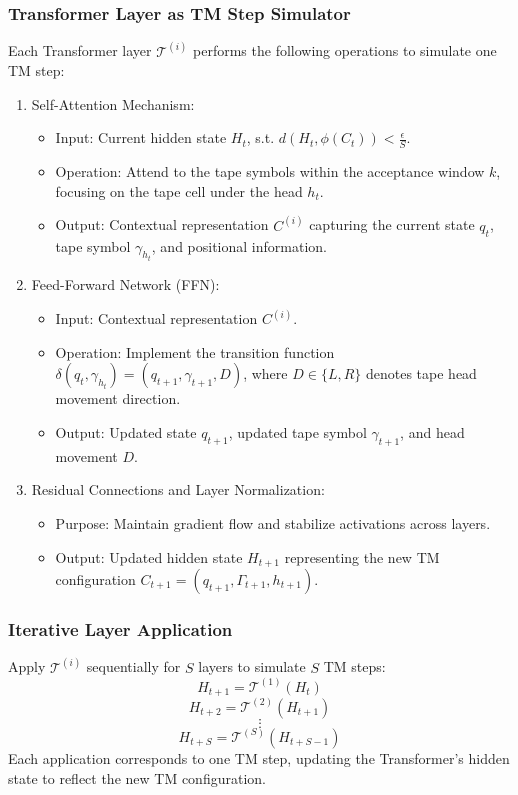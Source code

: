 \subsubsection{Transformer Layer as TM Step Simulator}
Each Transformer layer \( \mathcal{T}^{(i)} \) performs the following operations to simulate one TM step:
\begin{enumerate}
    \item {Self-Attention Mechanism}:
    \begin{itemize}
        \item {Input}: Current hidden state \( H_t \), s.t. \( d(H_t,\phi(C_t))<\frac{\epsilon}{S}\).
        \item {Operation}: Attend to the tape symbols within the acceptance window \( k \), focusing on the tape cell under the head \( h_t \).
        \item {Output}: Contextual representation \( C^{(i)} \) capturing the current state \( q_t \), tape symbol \( \gamma_{h_t} \), and positional information.
    \end{itemize}
    \item {Feed-Forward Network (FFN)}:
    \begin{itemize}
        \item {Input}: Contextual representation \( C^{(i)} \).
        \item {Operation}: Implement the transition function \( \delta(q_t, \gamma_{h_t}) = (q_{t+1}, \gamma_{t+1}, D) \), where \( D \in \{L, R\} \) denotes tape head movement direction.
        \item {Output}: Updated state \( q_{t+1} \), updated tape symbol \( \gamma_{t+1} \), and head movement \( D \).
    \end{itemize}
    \item {Residual Connections and Layer Normalization}:
    \begin{itemize}
        \item {Purpose}: Maintain gradient flow and stabilize activations across layers.
        \item {Output}: Updated hidden state \( H_{t+1} \) representing the new TM configuration \( C_{t+1} = (q_{t+1}, \Gamma_{t+1}, h_{t+1}) \).
    \end{itemize}
\end{enumerate}


\subsubsection{Iterative Layer Application}
Apply \( \mathcal{T}^{(i)} \) sequentially for \( S \) layers to simulate \( S \) TM steps:
\[
H_{t+1} = \mathcal{T}^{(1)}(H_t)
\]
\[
H_{t+2} = \mathcal{T}^{(2)}(H_{t+1})
\]
\[
\vdots
\]
\[
H_{t+S} = \mathcal{T}^{(S)}(H_{t+S-1})
\]
Each application corresponds to one TM step, updating the Transformer's hidden state to reflect the new TM configuration.

